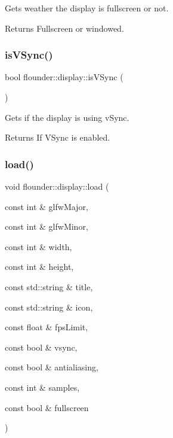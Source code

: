 Gets weather the display is fullscreen or not. 

\begin{DoxyReturn}{Returns}
Fullscreen or windowed. 
\end{DoxyReturn}
\mbox{\label{classflounder_1_1display_a75f2ff773d4d26740df8531b20b0a091}} 
\subsubsection{\texorpdfstring{is\+V\+Sync()}{isVSync()}}
{\footnotesize\ttfamily bool flounder\+::display\+::is\+V\+Sync (\begin{DoxyParamCaption}{ }\end{DoxyParamCaption})}



Gets if the display is using v\+Sync. 

\begin{DoxyReturn}{Returns}
If V\+Sync is enabled. 
\end{DoxyReturn}
\mbox{\label{classflounder_1_1display_ac1ad6ed9b98b6f760fecd2e31d84357b}} 
\subsubsection{\texorpdfstring{load()}{load()}}
{\footnotesize\ttfamily void flounder\+::display\+::load (\begin{DoxyParamCaption}\item[{const int \&}]{glfw\+Major,  }\item[{const int \&}]{glfw\+Minor,  }\item[{const int \&}]{width,  }\item[{const int \&}]{height,  }\item[{const std\+::string \&}]{title,  }\item[{const std\+::string \&}]{icon,  }\item[{const float \&}]{fps\+Limit,  }\item[{const bool \&}]{vsync,  }\item[{const bool \&}]{antialiasing,  }\item[{const int \&}]{samples,  }\item[{const bool \&}]{fullscreen }\end{DoxyParamCaption})}



